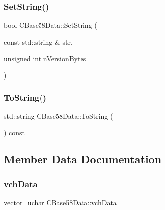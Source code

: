 \mbox{\label{class_c_base58_data_a495bf25426b4d24712828f5c9e9dda53}} 
\subsubsection{\texorpdfstring{Set\+String()}{SetString()}\hspace{0.1cm}{\footnotesize\ttfamily [2/2]}}
{\footnotesize\ttfamily bool C\+Base58\+Data\+::\+Set\+String (\begin{DoxyParamCaption}\item[{const std\+::string \&}]{str,  }\item[{unsigned int}]{n\+Version\+Bytes }\end{DoxyParamCaption})}

\mbox{\label{class_c_base58_data_a7dc91af403ca02694b3247b15604e220}} 
\subsubsection{\texorpdfstring{To\+String()}{ToString()}}
{\footnotesize\ttfamily std\+::string C\+Base58\+Data\+::\+To\+String (\begin{DoxyParamCaption}{ }\end{DoxyParamCaption}) const}



\subsection{Member Data Documentation}
\mbox{\label{class_c_base58_data_ae7ef7dfb93683aa4aaee8b74da5abb9c}} 
\subsubsection{\texorpdfstring{vch\+Data}{vchData}}
{\footnotesize\ttfamily \mbox{\hyperlink{class_c_base58_data_a193d64487a0b4f6df24f8bd380956ec1}{vector\+\_\+uchar}} C\+Base58\+Data\+::vch\+Data\hspace{0.3cm}{\ttfamily [protected]}}

